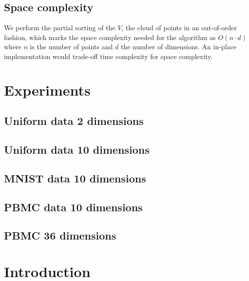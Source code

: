 \documentclass{juliacon}
\begin{document}
\subsection{Space complexity}
We perform the partial sorting of the $V$, the cloud of points in an out-of-order fashion,
which marks the space complexity needed for the algorithm as $O(n\cdot d)$ where $n$ is
the number of points and $d$ the number of dimensions. An in-place implementation would
trade-off time complexity for space complexity.


\section{Experiments}

\subsection{Uniform data 2 dimensions}
\subsection{Uniform data 10 dimensions}
\subsection{MNIST data 10 dimensions}
\subsection{PBMC data 10 dimensions}
\subsection{PBMC 36 dimensions}

\section{Introduction}
\end{document}
